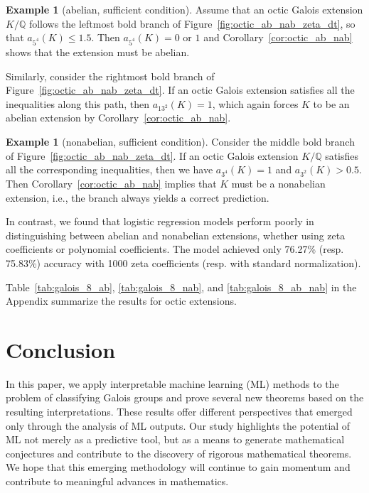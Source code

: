 \documentclass[letterpaper, 10pt]{article}
\newcommand{\1}{\mathds{1}}	%
\theoremstyle{definition}
\newtheorem{example}[theorem]{Example}
\theoremstyle{remark}
\begin{document}
\begin{example}[abelian, sufficient condition]
    Assume that an octic Galois extension \( K / \mathbb{Q} \) follows the leftmost bold branch of Figure~\ref{fig:octic_ab_nab_zeta_dt}, so that \( a_{5^4}(K) \le 1.5 \).   
    Then $a_{5^4}(K) = 0$ or $1$ and Corollary~\ref{cor:octic_ab_nab} shows that the extension must be abelian.

    Similarly, consider the rightmost bold branch of Figure~\ref{fig:octic_ab_nab_zeta_dt}.  
    If an octic Galois extension satisfies all the inequalities along this path, then \( a_{13^2}(K) = 1 \), which again forces \( K \) to be an abelian extension by Corollary~\ref{cor:octic_ab_nab}.
\end{example}

\begin{example}[nonabelian, sufficient condition]
    Consider the middle bold branch of Figure~\ref{fig:octic_ab_nab_zeta_dt}.  
If an octic Galois extension \( K / \mathbb{Q} \) satisfies all the corresponding inequalities, then we have \( a_{3^4}(K) = 1 \) and \( a_{3^2}(K) > 0.5 \).  
Then Corollary~\ref{cor:octic_ab_nab} implies that \( K \) must be a nonabelian extension, i.e., the branch always yields a correct prediction.
\end{example}

In contrast, we found that logistic regression models perform poorly in distinguishing between abelian and nonabelian extensions, whether using zeta coefficients or polynomial coefficients.  
The model achieved only 76.27\% (resp. 75.83\%) accuracy with 1000 zeta coefficients (resp. with standard normalization).

Table~\ref{tab:galois_8_ab}, \ref{tab:galois_8_nab}, and \ref{tab:galois_8_ab_nab} in the Appendix summarize the results for octic extensions.





\section{Conclusion}
\label{sec:conclusion}


In this paper, we apply interpretable machine learning (ML) methods to the problem of classifying Galois groups and prove several new theorems based on the resulting interpretations.
These results offer different perspectives that emerged only through the analysis of ML outputs.  Our study highlights the potential of ML not merely as a predictive tool, but as a means to generate mathematical conjectures and contribute to the discovery of rigorous mathematical theorems.
We hope that this emerging methodology will continue to gain momentum and contribute to meaningful advances in mathematics.
\end{document}
